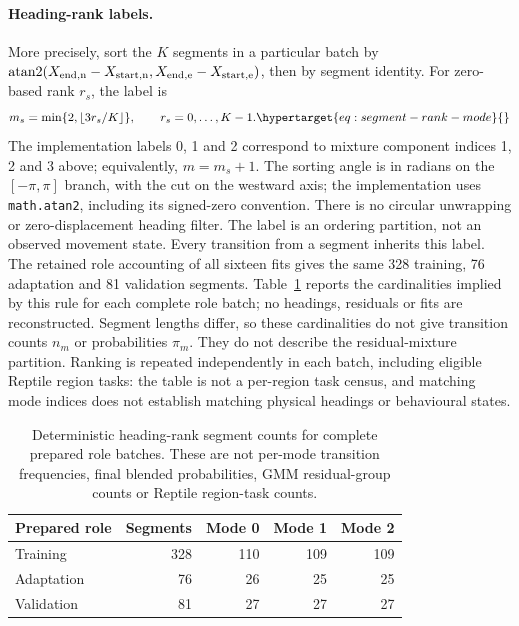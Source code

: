 \paragraph{Heading-rank labels.}
More precisely, sort the \(K\) segments in a particular batch by
\(\operatorname{atan2}(X_{\rm end,n}-X_{\rm start,n},
X_{\rm end,e}-X_{\rm start,e})\), then by segment identity. For zero-based
rank \(r_s\), the label is
\begin{equation}
 m_s=\min\{2,\lfloor 3r_s/K\rfloor\},\qquad r_s=0,\ldots,K-1.
 \label{eq:segment-rank-mode}\hypertarget{eq:segment-rank-mode}{}
\end{equation}
The implementation labels 0, 1 and 2 correspond to mixture component
indices 1, 2 and 3 above; equivalently, \(m=m_s+1\).
The sorting angle is in radians on the \([-\pi,\pi]\) branch, with the
cut on the westward axis; the implementation uses \texttt{math.atan2},
including its signed-zero convention. There is no circular unwrapping or
zero-displacement heading filter. The label is an ordering partition,
not an observed movement state.
Every transition from a segment inherits this label. The retained role
accounting of all sixteen fits gives the same 328 training, 76 adaptation
and 81 validation segments. Table~\ref{tab:mode-rank-cardinality} reports
the cardinalities implied by this rule for each complete role batch;
no headings, residuals or fits are reconstructed. Segment lengths differ,
so these cardinalities do not give transition counts \(n_m\) or probabilities
\(\pi_m\). They do not describe the residual-mixture partition. Ranking is
repeated independently in each batch, including eligible Reptile region
tasks: the table is not a per-region task census, and matching mode indices
does not establish matching physical headings or behavioural states.

\begin{table}[htbp]
\centering\small
\caption{Deterministic heading-rank segment counts for complete prepared
role batches. These are not per-mode transition frequencies, final blended
probabilities, GMM residual-group counts or Reptile region-task counts.}
\label{tab:mode-rank-cardinality}\hypertarget{tab:mode-rank-cardinality}{}
\begin{tabular}{lrrrr}
\toprule
Prepared role & Segments & Mode 0 & Mode 1 & Mode 2\\
\midrule
Training & 328 & 110 & 109 & 109\\
Adaptation & 76 & 26 & 25 & 25\\
Validation & 81 & 27 & 27 & 27\\
\bottomrule
\end{tabular}
\end{table}

